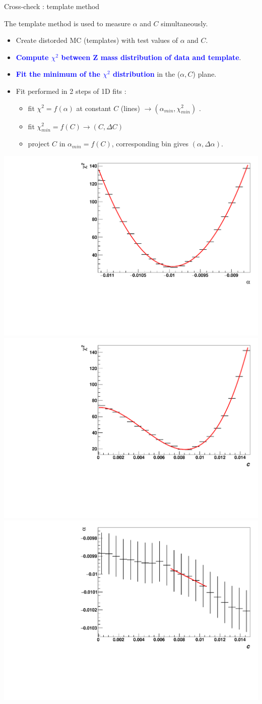 \begin{frame}{Cross-check : template method}
\begin{minipage}{0.59\linewidth}
  The template method is used to measure $\alpha$ and $C$ simultaneously.
\begin{itemize}
\item Create distorded MC (templates) with test values of $\alpha$ and $C$.
\item \textcolor{blue}{\bf Compute $\chi^2$ between Z mass distribution of data and template}.
\item \textcolor{blue}{\bf Fit the minimum of the $\chi^2$ distribution} in the ($\alpha,C$) plane.
\item Fit performed in 2 steps of 1D fits : 
\begin{itemize}
\item fit $\chi^2=f(\alpha)$ at constant $C$ (lines) $\rightarrow (\alpha_{min}, \chi^2_{min})$ .
\item fit $\chi^2_{min}=f(C)\rightarrow (C, \Delta C)$
\item project $C$ in $\alpha_{min}=f(C)$, corresponding bin gives $(\alpha, \Delta\alpha)$.
\end{itemize}
\end{itemize}
  \includegraphics[width=0.325\linewidth]{plots/Backup/MC6_0_0_chi2FitNonConstVar_10.pdf}
  \includegraphics[width=0.325\linewidth]{plots/Backup/MC6_0_0_chi2FitConstVar.pdf}
  \includegraphics[width=0.325\linewidth]{plots/Backup/MC6_0_0_corAngle.pdf}

\end{minipage}
\end{frame}
